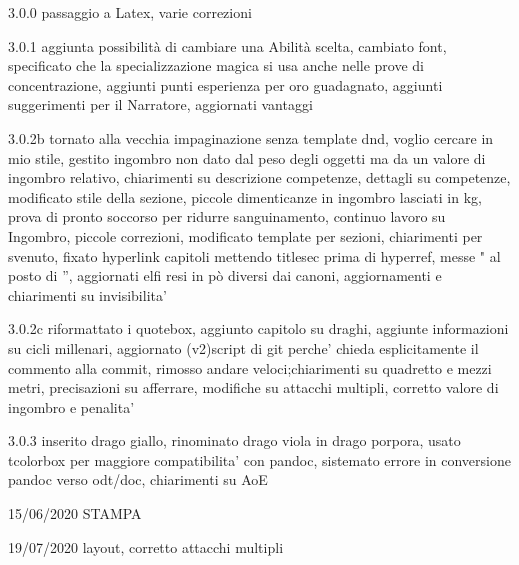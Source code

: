 \documentclass[a4paper,11pt,twoside,openany]{book}
\begin{document}
{	3.0.0 passaggio a Latex, varie correzioni

	3.0.1 aggiunta possibilità di cambiare una Abilità scelta, cambiato font, specificato che la specializzazione magica si usa anche nelle prove di concentrazione, aggiunti punti esperienza per oro guadagnato, aggiunti suggerimenti per il Narratore, aggiornati vantaggi

	3.0.2b tornato alla vecchia impaginazione senza template dnd, voglio cercare in mio stile, gestito ingombro non dato dal peso degli oggetti ma da un valore di ingombro relativo, chiarimenti su descrizione competenze, dettagli su competenze, modificato stile della sezione, piccole dimenticanze in ingombro lasciati in kg, prova di pronto soccorso per ridurre sanguinamento, continuo lavoro su Ingombro, piccole correzioni, modificato template per sezioni, chiarimenti per svenuto, fixato hyperlink capitoli mettendo titlesec prima di hyperref, messe " al posto di '', aggiornati elfi resi in pò diversi dai canoni, aggiornamenti e chiarimenti su invisibilita'

	3.0.2c riformattato i quotebox, aggiunto capitolo su draghi, aggiunte informazioni su cicli millenari, aggiornato (v2)script di git perche' chieda esplicitamente il commento alla commit, rimosso andare veloci;chiarimenti su quadretto e mezzi metri, precisazioni su afferrare, modifiche su attacchi multipli, corretto valore di ingombro e penalita'

	3.0.3 inserito drago giallo, rinominato drago viola in drago porpora, usato tcolorbox per maggiore compatibilita' con pandoc, sistemato errore in conversione pandoc verso odt/doc, chiarimenti su AoE

	15/06/2020 STAMPA

	19/07/2020 layout, corretto attacchi multipli

}
\end{document}
